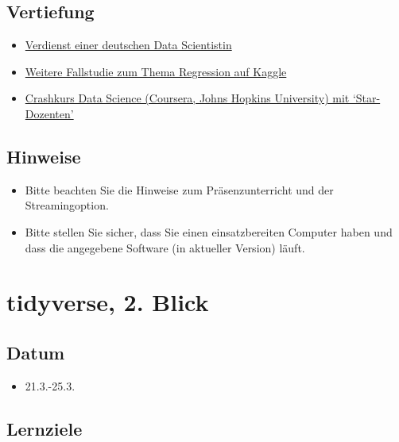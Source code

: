 \documentclass[
]{book}
\providecommand{\tightlist}{%
  \setlength{\itemsep}{0pt}\setlength{\parskip}{0pt}}
\begin{document}
\hypertarget{vertiefung}{%
\subsection{Vertiefung}\label{vertiefung}}

\begin{itemize}
\tightlist
\item
  \href{https://www.zeit.de/arbeit/2020-10/data-scientist-gehalt-geldanlage-programmieren-kontoauszug}{Verdienst einer deutschen Data Scientistin}
\item
  \href{https://www.kaggle.com/micahshull/r-bike-sharing-linear-regression}{Weitere Fallstudie zum Thema Regression auf Kaggle}
\item
  \href{https://www.coursera.org/learn/data-science-course}{Crashkurs Data Science (Coursera, Johns Hopkins University) mit `Star-Dozenten'}
\end{itemize}

\hypertarget{hinweise}{%
\subsection{Hinweise}\label{hinweise}}

\begin{itemize}
\tightlist
\item
  Bitte beachten Sie die Hinweise zum Präsenzunterricht und der Streamingoption.
\item
  Bitte stellen Sie sicher, dass Sie einen einsatzbereiten Computer haben und dass die angegebene Software (in aktueller Version) läuft.
\end{itemize}

\hypertarget{tidyverse-2.-blick}{%
\section{tidyverse, 2. Blick}\label{tidyverse-2.-blick}}

\hypertarget{datum-1}{%
\subsection{Datum}\label{datum-1}}

\begin{itemize}
\tightlist
\item
  21.3.-25.3.
\end{itemize}

\hypertarget{lernziele-2}{%
\subsection{Lernziele}\label{lernziele-2}}
\end{document}
